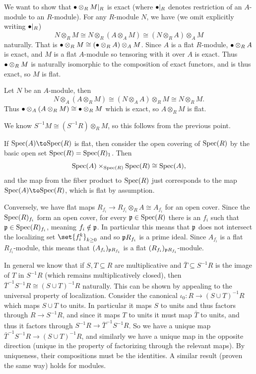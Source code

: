 \benum
    \item We want to show that $\bullet\otimes_RM|_R$ is exact (where $\bullet|_R$ denotes restriction of an $A$-module to an $R$-module).
    For any $R$-module $N$, we have (we omit explicitly writing $\bullet|_R$)
    $$ N \otimes_R M \cong N \otimes_R (A\otimes_AM) \cong (N\otimes_RA) \otimes_A M $$
    naturally.
    That is $\bullet\otimes_RM\cong(\bullet\otimes_RA)\otimes_AM$.
    Since $A$ is a flat $R$-module, $\bullet\otimes_RA$ is exact, and $M$ is a flat $A$-module so tensoring with it over $A$ is exact.
    Thus $\bullet\otimes_RM$ is naturally isomorphic to the composition of exact functors, and is thus exact, so $M$ is flat.

    \item Let $N$ be an $A$-module, then
    $$ N \otimes_A (A\otimes_RM) \cong (N\otimes_AA) \otimes_R M \cong N \otimes_R M . $$
    Thus $\bullet\otimes_A(A\otimes_RM)\cong\bullet\otimes_RM$ which is exact, so $A\otimes_RM$ is flat.

    \item We know $S^{-1}M\cong(S^{-1}R)\otimes_RM$, so this follows from the previous point.

    \item If $\spec(A)\to\spec(R)$ is flat, then consider the open covering of ${\rm Spec}(R)$ by the basic open set ${\rm Spec}(R)={\rm Spec}(R)_1$.
    Then
    $$ {\rm Spec}(A) \times_{{\rm Spec}(R)} {\rm Spec}(R) \cong {\rm Spec}(A) , $$
    and the map from the fiber product to ${\rm Spec}(R)$ just corresponds to the map $\spec(A)\to\spec(R)$, which is flat by assumption.

    Conversely, we have flat maps $R_{f_i}\to R_{f_i}\otimes_RA\cong A_{f_i}$ for an open cover.
    Since the ${\rm Spec}(R)_{f_i}$ form an open cover, for every ${{\frak p}}\in{\rm Spec}(R)$ there is an $f_i$ such that ${{\frak p}}\in{\rm Spec}(R)_{f_i}$, meaning $f_i\notin{{\frak p}}$.
    In particular this means that ${{\frak p}}$ does not intersect the localizing set $\set{f_i^k}_{k\geq0}$ and so ${{\frak p}} R_{f_i}$ is a prime ideal.
    Since $A_{f_i}$ is a flat $R_{f_i}$-module, this means that $(A_{f_i})_{{{\frak p}} R_{f_i}}$ is a flat $(R_{f_i})_{{{\frak p}} R_{f_i}}$-module.

    In general we know that if $S,T\subseteq R$ are multiplicative and $\bar T\subseteq S^{-1}R$ is the image of $T$ in $S^{-1}R$ (which remains multiplicatively closed),
    then $\bar T^{-1}S^{-1}R\cong (S\cup T)^{-1}R$ naturally.
    This can be shown by appealing to the universal property of localization.
    Consider the canonical $\iota_0\colon R\to(S\cup T)^{-1}R$ which maps $S\cup T$ to units.
    In particular it maps $S$ to units and thus factors through $R\to S^{-1}R$, and since it maps $T$ to units it must map $\bar T$ to units, and thus it factors through
    $S^{-1}R\to\bar T^{-1}S^{-1}R$.
    So we have a unique map $\bar T^{-1}S^{-1}R\to(S\cup T)^{-1}R$, and similarly we have a unique map in the opposite direction (unique in the property of factorizing through
    the relevant maps).
    By uniqueness, their compositions must be the identities.
    A similar result (proven the same way) holds for modules.

